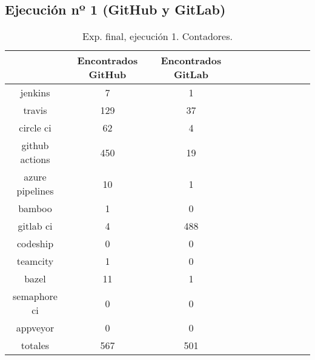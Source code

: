 

\subsection{Ejecución nº 1 (GitHub y GitLab)}

\begin{table}[h]
  \centering
  \caption{Exp. final, ejecución 1. Contadores.}
  \label{tab:tabla_f1_1}

\begin{footnotesize}
\renewcommand{\arraystretch}{1.5} %
\begin{tabular}{ccccccccccc}
  \hline
  {} &  Encontrados GitHub &  Encontrados GitLab \\
  \hline
  jenkins         &                   7 &                   1 \\
  travis          &                 129 &                  37 \\
  circle ci       &                  62 &                   4 \\
  github actions  &                 450 &                  19 \\
  azure pipelines &                  10 &                   1 \\
  bamboo          &                   1 &                   0 \\
  gitlab ci       &                   4 &                 488 \\
  codeship        &                   0 &                   0 \\
  teamcity        &                   1 &                   0 \\
  bazel           &                  11 &                   1 \\
  semaphore ci    &                   0 &                   0 \\
  appveyor        &                   0 &                   0 \\
  totales         &                 567 &                 501 \\
 \end{tabular}
\end{footnotesize}

\end{table}

